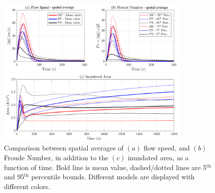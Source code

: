 \documentclass{article}
\begin{document}
\begin{figure}[H]
        \centering
        \includegraphics[width=0.85\textwidth]{BAF_VolcanDeColima/AveragedMeasurments/Averaged_MeasuresColima.png}
        \caption{Comparison between spatial averages of $(a)$ flow speed, and $(b)$ Froude Number, in addition to the $(c)$ inundated area, as a function of time. Bold line is mean value, dashed/dotted lines are 5$^{\mathrm{th}}$ and 95$^{\mathrm{th}}$ percentile bounds. Different models are displayed with different colors.}
        \label{fig:Colima-spatial}
\end{figure}
\end{document}
